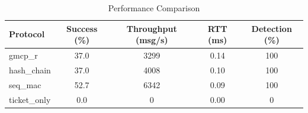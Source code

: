 \begin{table}[t]
\centering
\caption{Performance Comparison}
\begin{tabular}{lcccc}
\toprule
Protocol & Success (\%) & Throughput (msg/s) & RTT (ms) & Detection (\%) \\
\midrule
gmcp_r & 37.0 & 3299 & 0.14 & 100 \\
hash_chain & 37.0 & 4008 & 0.10 & 100 \\
seq_mac & 52.7 & 6342 & 0.09 & 100 \\
ticket_only & 0.0 & 0 & 0.00 & 0 \\
\bottomrule
\end{tabular}
\label{tab:performance}
\end{table}